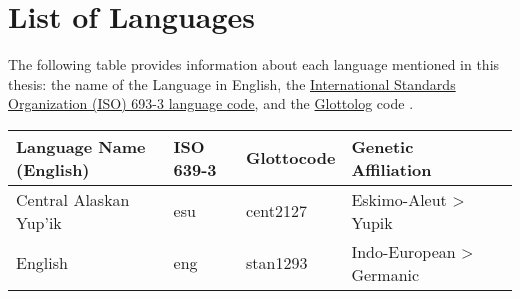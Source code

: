 \chapter*{List of Languages}
\label{ch:languages}

The following table provides information about each language mentioned in this thesis: the name of the Language in English, the \href{https://iso639-3.sil.org/}{International Standards Organization (ISO) 693-3 language code}, and the \href{https://glottolog.org/}{Glottolog} code \citep{HammarstromForkelHaspelmath2019}.

\renewcommand{\arraystretch}{1}

\begin{table}[h]
  \onehalfspacing
  \begin{tabularx}{\linewidth}{ l l l l l }
    \textbf{Language Name (English)} & \textbf{ISO 639-3} & \textbf{Glottocode} & \textbf{Genetic Affiliation}\\
    \midrule
    Central Alaskan Yup'ik           & esu                & cent2127            & Eskimo-Aleut > Yupik\\
    English                          & eng                & stan1293            & Indo-European > Germanic\\
  \end{tabularx}
\end{table}
